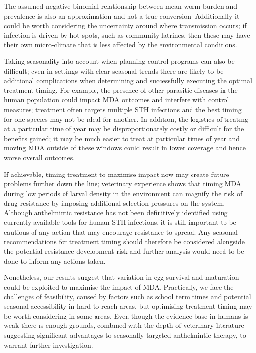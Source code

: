 The assumed negative binomial relationship between mean worm burden and prevalence is also an approximation and not a true conversion. Additionally it could be worth considering the uncertainty around where transmission occurs; if infection is driven by hot-spots, such as community latrines, then these may have their own micro-climate that is less affected by the environmental conditions.

Taking seasonality into account when planning control programs can also be difficult; even in settings with clear seasonal trends there are likely to be additional complications when determining and successfully executing the optimal treatment timing. For example, the presence of other parasitic diseases in the human population could impact MDA outcomes and interfere with control measures; treatment often targets multiple STH infections and the best timing for one species may not be ideal for another. In addition, the logistics of treating at a particular time of year may be disproportionately costly or difficult for the benefits gained; it may be much easier to treat at particular times of year and moving MDA outside of these windows could result in lower coverage and hence worse overall outcomes.

If achievable, timing treatment to maximise impact now may create future problems further down the line; veterinary experience shows that timing MDA during low periods of larval density in the environment can magnify the risk of drug resistance by imposing additional selection pressures on the system.  Although anthelmintic resistance has not been definitively identified using currently available tools for human STH infections, it is still important to be cautious of any action that may encourage resistance to spread. Any seasonal recommendations for treatment timing should therefore be considered alongside the potential resistance development risk and further analysis would need to be done to inform any actions taken.

Nonetheless, our results suggest that variation in egg survival and maturation could be exploited to maximise the impact of MDA. Practically, we face the challenges of feasibility, caused by factors such as school term times and potential seasonal accessibility in hard-to-reach areas, but optimising treatment timing may be worth considering in some areas. Even though the evidence base in humans is weak there is enough grounds, combined with the depth of veterinary literature suggesting significant advantages to seasonally targeted anthelmintic therapy, to warrant further investigation.

